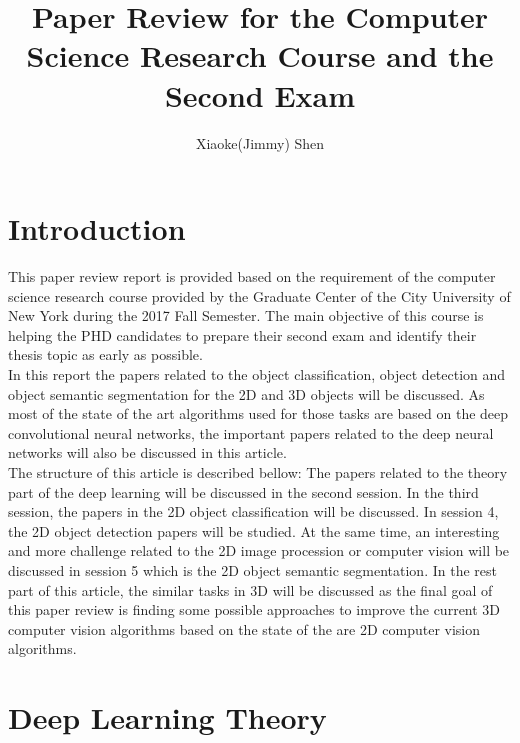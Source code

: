 \documentclass[a4paper,12pt]{article}
\begin{document}
\renewcommand\labelenumi{(\theenumi)}
\renewcommand{\vec}[1]{\mathbf{#1}}
\title {Paper Review for the Computer Science Research Course and the Second Exam }
\author{Xiaoke(Jimmy) Shen}
\maketitle
\section{Introduction}

This paper review report is provided based on the requirement of the computer science research course provided by the Graduate Center of the City University of New York during the 2017 Fall Semester. The main objective of this course is helping the PHD candidates to prepare their second exam and identify their thesis topic as early as possible\cite{ji2017}. \\
In this report the papers related to the object classification, object detection and object semantic segmentation for the 2D and 3D objects will be discussed. As most of the state of the art algorithms used for those tasks are based on the deep convolutional neural networks, the important papers related to the deep neural networks will also be discussed in this article.\\

The structure of this article is described bellow: The papers related to the theory part of the deep learning will be discussed in the second session. In the third session, the papers in the 2D object classification will be discussed. In session 4, the 2D object detection papers will be studied. At the same time, an interesting and more challenge related to the 2D image procession or computer vision will be discussed in session 5 which is the 2D object semantic segmentation. In the rest part of this article, the similar tasks in 3D will be discussed as the final goal of this paper review is finding some possible approaches to improve the current 3D computer vision algorithms based on the state of the are 2D computer vision algorithms.\\

\section{Deep Learning Theory}
\end{document}
